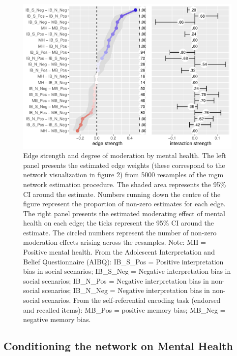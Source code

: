 \documentclass[man,floatsintext]{apa6}
\begin{document}
\begin{figure}
\centering
\includegraphics{script_files/figure-latex/unnamed-chunk-4-1.pdf}
\caption{\label{fig:unnamed-chunk-4}Edge strength and degree of moderation by mental health. The left panel presents the estimated edge weights (these correspond to the network visualization in figure 2) from 5000 resamples of the mgm network estimation procedure. The shaded area represents the 95\% CI around the estimate. Numbers running down the centre of the figure represent the proportion of non-zero estimates for each edge. The right panel presents the estimated moderating effect of mental health on each edge; the ticks represent the 95\% CI around the estimate. The circled numbers represent the number of non-zero moderation effects arising across the resamples.
Note: MH = Positive mental health. From the Adolescent Interpretation and Belief Questionnaire (AIBQ): IB\_S\_Pos = Positive interpretation bias in social scenarios; IB\_S\_Neg = Negative interpretation bias in social scenarios; IB\_N\_Pos = Negative interpretation bias in non-social scenarios; IB\_N\_Neg = Negative interpretation bias in non-social scenarios. From the self-referential encoding task (endorsed and recalled items): MB\_Pos = positive memory bias; MB\_Neg = negative memory bias.}
\end{figure}

\hypertarget{conditioning-the-network-on-mental-health}{%
\subsection{Conditioning the network on Mental Health}\label{conditioning-the-network-on-mental-health}}
\end{document}
